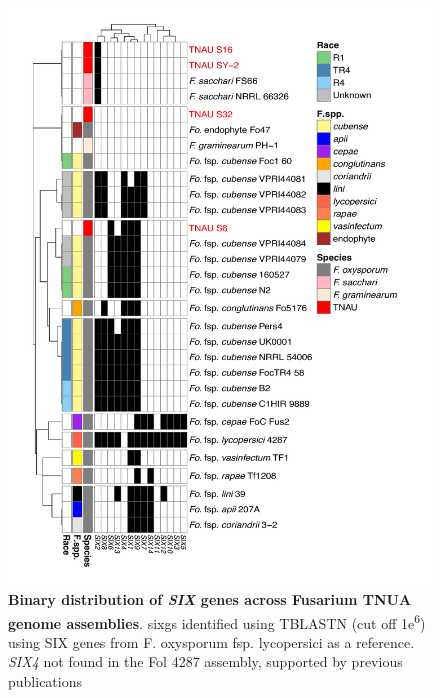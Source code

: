 \begin{figure}[htp!]
  \centering
  \includegraphics[width=15cm]{Figures/SIX_Heatmap.pdf}
  \caption[Binary distribution of \textit{SIX} genes across Fusarium TNUA genome assemblies]{\textbf{Binary distribution of \textit{SIX} genes across Fusarium TNUA genome assemblies}. \aclp{sixg} identified using TBLASTN (cut off 1\-e\textsuperscript{6}) using SIX genes from F. oxysporum fsp. lycopersici as a reference. \textit{SIX4} not found in the \acl{Fol} 4287 assembly, supported by previous publications \parencite{Czislowski2018}}
  \label{fig:SixTNAU}
\end{figure}

